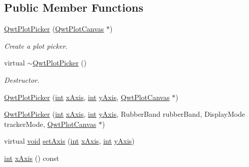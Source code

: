 \subsection*{Public Member Functions}
\begin{DoxyCompactItemize}
\item 
\hyperlink{class_qwt_plot_picker_af07dcf038557fae06afdd7ec6e974c5c}{Qwt\-Plot\-Picker} (\hyperlink{class_qwt_plot_canvas}{Qwt\-Plot\-Canvas} $\ast$)
\begin{DoxyCompactList}\small\item\em Create a plot picker. \end{DoxyCompactList}\item 
virtual \hyperlink{class_qwt_plot_picker_a0a13f683558c0e3bdb796a3b508be159}{$\sim$\-Qwt\-Plot\-Picker} ()
\begin{DoxyCompactList}\small\item\em Destructor. \end{DoxyCompactList}\item 
\hyperlink{class_qwt_plot_picker_a20ca8f322be817d1890232d1b2764e49}{Qwt\-Plot\-Picker} (\hyperlink{ioapi_8h_a787fa3cf048117ba7123753c1e74fcd6}{int} \hyperlink{class_qwt_plot_picker_a9cdd6d56e990173a00c6c81edbe8818d}{x\-Axis}, \hyperlink{ioapi_8h_a787fa3cf048117ba7123753c1e74fcd6}{int} \hyperlink{class_qwt_plot_picker_a3068fb734845abfdf5dff00ead18377f}{y\-Axis}, \hyperlink{class_qwt_plot_canvas}{Qwt\-Plot\-Canvas} $\ast$)
\item 
\hyperlink{class_qwt_plot_picker_a711f4147dd472a351689c818b2f6355d}{Qwt\-Plot\-Picker} (\hyperlink{ioapi_8h_a787fa3cf048117ba7123753c1e74fcd6}{int} \hyperlink{class_qwt_plot_picker_a9cdd6d56e990173a00c6c81edbe8818d}{x\-Axis}, \hyperlink{ioapi_8h_a787fa3cf048117ba7123753c1e74fcd6}{int} \hyperlink{class_qwt_plot_picker_a3068fb734845abfdf5dff00ead18377f}{y\-Axis}, Rubber\-Band rubber\-Band, Display\-Mode tracker\-Mode, \hyperlink{class_qwt_plot_canvas}{Qwt\-Plot\-Canvas} $\ast$)
\item 
virtual \hyperlink{group___u_a_v_objects_plugin_ga444cf2ff3f0ecbe028adce838d373f5c}{void} \hyperlink{class_qwt_plot_picker_aa901c86543585c7056133a5cb6652e3d}{set\-Axis} (\hyperlink{ioapi_8h_a787fa3cf048117ba7123753c1e74fcd6}{int} \hyperlink{class_qwt_plot_picker_a9cdd6d56e990173a00c6c81edbe8818d}{x\-Axis}, \hyperlink{ioapi_8h_a787fa3cf048117ba7123753c1e74fcd6}{int} \hyperlink{class_qwt_plot_picker_a3068fb734845abfdf5dff00ead18377f}{y\-Axis})
\item 
\hyperlink{ioapi_8h_a787fa3cf048117ba7123753c1e74fcd6}{int} \hyperlink{class_qwt_plot_picker_a9cdd6d56e990173a00c6c81edbe8818d}{x\-Axis} () const 

\end{DoxyCompactItemize}
